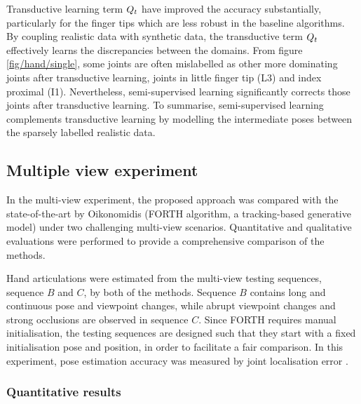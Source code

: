 Transductive learning term $Q_{t}$ have improved the accuracy substantially, particularly for the finger tips which are less robust in the baseline algorithms.  
By coupling realistic data with synthetic data, the transductive term $Q_{t}$ effectively learns the discrepancies between the domains.
From figure \ref{fig/hand/single}, some joints are often mislabelled as other more dominating joints after transductive learning, \eg joints in little finger tip (L3) and index proximal (I1). 
Nevertheless, semi-supervised learning significantly corrects those joints after transductive learning. To summarise, semi-supervised learning complements transductive learning by modelling the intermediate poses between the sparsely labelled realistic data.    


\subsection{Multiple view experiment}  

In the multi-view experiment, the proposed approach was compared with the state-of-the-art by Oikonomidis \etal (FORTH algorithm, a tracking-based generative model) \cite{Oikonomidis2011} under two challenging multi-view scenarios. Quantitative and qualitative evaluations were performed to provide a comprehensive comparison of the methods. 

Hand articulations were estimated from the multi-view testing sequences, \ie sequence $B$ and $C$, by both of the methods. 
Sequence $B$ contains long and continuous pose and viewpoint changes, while abrupt viewpoint changes and strong occlusions are observed in sequence $C$.  
Since FORTH requires manual initialisation, the testing sequences are designed such that they start with a fixed initialisation pose and position, in order to facilitate a fair comparison.   
In this experiment, pose estimation accuracy was measured by joint localisation error \cite{Oikonomidis2011}.

\subsubsection{Quantitative results}

